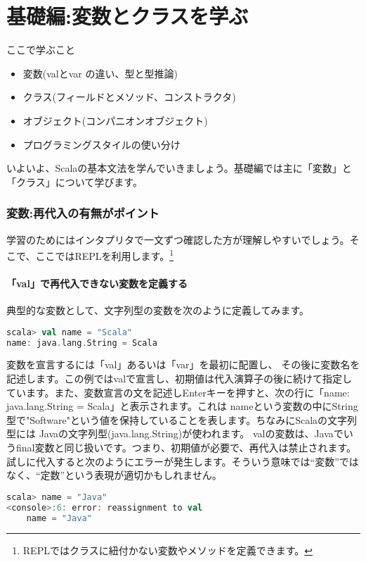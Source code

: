 \part{基礎編:変数とクラスを学ぶ}
\begin{itembox}[l]{ここで学ぶこと}
\begin{itemize}
\item 変数(valとvar の違い、型と型推論) 
\item クラス(フィールドとメソッド、コンストラクタ) 
\item オブジェクト(コンパニオンオブジェクト)
\item プログラミングスタイルの使い分け
\end{itemize}
\end{itembox}
いよいよ、Scalaの基本文法を学んでいきましょう。基礎編では主に「変数」と「クラス」について学びます。

\section{変数:再代入の有無がポイント}
学習のためにはインタプリタで一文ずつ確認した方が理解しやすいでしょう。そこで、ここではREPLを利用します。\footnote{REPLではクラスに紐付かない変数やメソッドを定義できます。}
\subsection{「val」で再代入できない変数を定義する}
典型的な変数として、文字列型の変数を次のように定義してみます。

\begin{lstlisting}[language=scala, frame=none]
scala> val name = "Scala"
name: java.lang.String = Scala
\end{lstlisting}

変数を宣言するには「val」あるいは「var」を最初に配置し、 その後に変数名を記述します。この例ではvalで宣言し、初期値は代入演算子の後に続けて指定しています。また、変数宣言の文を記述しEnterキーを押すと、次の行に「name: java.lang.String = Scala」と表示されます。これは nameという変数の中にString型で"Software"という値を保持していることを表します。ちなみにScalaの文字列型には Javaの文字列型(java.lang.String)が使われます。 valの変数は、Javaでいうfinal変数と同じ扱いです。つまり、初期値が必要で、再代入は禁止されます。試しに代入すると次のようにエラーが発生します。そういう意味では“変数”ではなく、“定数”という表現が適切かもしれません。

\begin{lstlisting}[language=scala, frame=none]
scala> name = "Java"
<console>:6: error: reassignment to val
    name = "Java"
\end{lstlisting}

